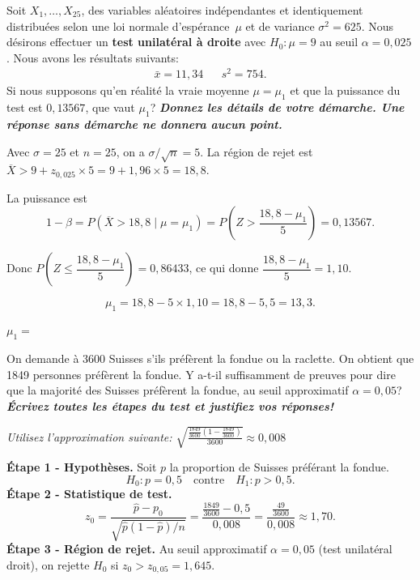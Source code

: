 \begin{questions}
\pageblanche
\question[10] Soit $X_1,\hdots, X_{25}$, des variables aléatoires indépendantes et identiquement distribuées selon une loi normale d'espérance~$\mu$ et de variance $\sigma^2=625$.
Nous désirons effectuer un \textbf{test unilatéral à droite} avec $H_0:\mu=9$ au seuil $\alpha = 0,025$.
Nous avons les résultats suivants:
\begin{align*}
    \bar{x}= 11,34 &  & s^2=754.
\end{align*}
Si nous supposons qu'en réalité la vraie moyenne $\mu=\mu_1$ et que la puissance du test est $0,13567$, que vaut $\mu_1$? 
\textbf{\textit{Donnez les détails de votre démarche. Une réponse sans démarche ne donnera aucun point.}}
\begin{solution}
Avec $\sigma=25$ et $n=25$, on a $\sigma/\sqrt{n}=5$.
La région de rejet est $\overline{X} > 9 + z_{0{,}025}\times 5 = 9 + 1{,}96\times 5 = 18{,}8$.

La puissance est
\[
1-\beta = P\!\left(\overline{X}>18{,}8\mid \mu=\mu_1\right)
= P\!\left(Z > \frac{18{,}8-\mu_1}{5}\right) = 0{,}13567.
\]

Donc $P\!\left(Z \leq \dfrac{18{,}8-\mu_1}{5}\right) = 0{,}86433$, ce qui donne
$\dfrac{18{,}8-\mu_1}{5} = 1{,}10$.

\[
\mu_1 = 18{,}8 - 5\times 1{,}10 = 18{,}8 - 5{,}5 = 13{,}3.
\]
\end{solution}
\vspace{18cm}
$\mu_1=$ 

\pageblanche
\question[10] On demande à 3600 Suisses s'ils préfèrent la fondue ou la raclette. On obtient que 1849 personnes préfèrent la fondue. Y a-t-il suffisamment de preuves pour dire que la majorité des Suisses préfèrent la fondue, au seuil approximatif $\alpha = 0,05$? \textbf{\textit{Écrivez toutes les étapes du test et justifiez vos réponses!}}

\textit{Utilisez l'approximation suivante: $\displaystyle\sqrt{\frac{\frac{1849}{3600}\left(1-\frac{1849}{3600}\right)}{3600}}\approx0,008$}
\begin{solution}
\textbf{Étape 1 - Hypothèses.} Soit $p$ la proportion de Suisses préférant la fondue.
\[
H_0: p=0{,}5 \quad \text{contre} \quad H_1: p > 0{,}5.
\]
\textbf{Étape 2 - Statistique de test.}
\[
z_0 = \frac{\hat{p}-p_0}{\sqrt{\hat{p}(1-\hat{p})/n}}
= \frac{\frac{1849}{3600}-0{,}5}{0{,}008}
= \frac{\frac{49}{3600}}{0{,}008} \approx 1{,}70.
\]
\textbf{Étape 3 - Région de rejet.} Au seuil approximatif $\alpha=0{,}05$ (test unilatéral droit), on rejette $H_0$ si $z_0 > z_{0{,}05} = 1{,}645$.


\end{solution}
\end{questions}
